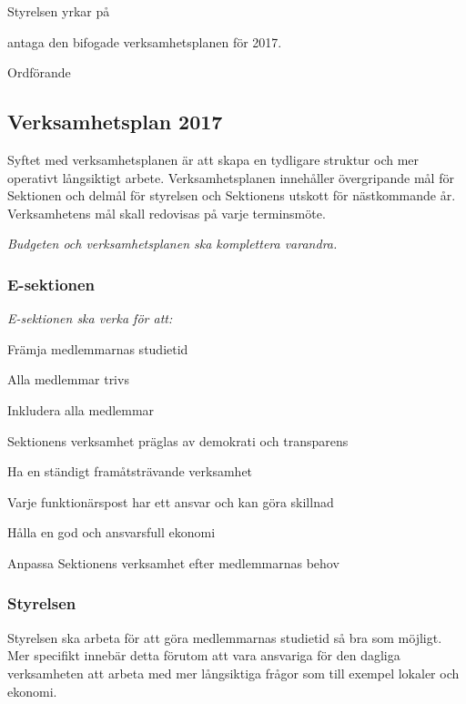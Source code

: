 \documentclass[../_main/handlingar.tex]{subfiles}
\begin{document}

Styrelsen yrkar på

\begin{attsatser}
    \att antaga den bifogade verksamhetsplanen för 2017.
\end{attsatser}

\begin{signatures}{1}
    \ist
    \signature{\ordf}{Ordförande}
\end{signatures}

\subsection*{Verksamhetsplan 2017}

Syftet med verksamhetsplanen är att skapa en tydligare struktur och mer operativt långsiktigt arbete. Verksamhetsplanen innehåller övergripande mål för Sektionen och delmål för styrelsen och Sektionens utskott för nästkommande år. Verksamhetens mål skall redovisas på varje terminsmöte.

\emph{Budgeten och verksamhetsplanen ska komplettera varandra.}

\subsubsection*{E-sektionen}
\emph{E-sektionen ska verka för att:}
\begin{dashlist}
    \item Främja medlemmarnas studietid
    \item Alla medlemmar trivs
    \item Inkludera alla medlemmar
    \item Sektionens verksamhet präglas av demokrati och transparens
    \item Ha en ständigt framåtsträvande verksamhet
    \item Varje funktionärspost har ett ansvar och kan göra skillnad
    \item Hålla en god och ansvarsfull ekonomi
    \item Anpassa Sektionens verksamhet efter medlemmarnas behov
\end{dashlist}

\subsubsection*{Styrelsen}
Styrelsen ska arbeta för att göra medlemmarnas studietid så bra som möjligt. Mer specifikt innebär detta förutom att vara ansvariga för den dagliga verksamheten att arbeta med mer långsiktiga frågor som till exempel lokaler och ekonomi.
\end{document}
